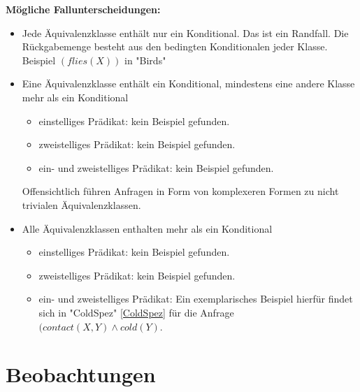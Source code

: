 \documentclass[a4paper, 11pt]{book}
\begin{document}
\textbf{Mögliche Fallunterscheidungen:}\label{Fallunterscheidung Formel MehrAequi}
	\begin{itemize}
		\item Jede Äquivalenzklasse enthält nur ein Konditional. Das ist ein Randfall. Die Rückgabemenge besteht aus den bedingten Konditionalen jeder Klasse. Beispiel $ (flies(X)) $ in "{}Birds"{}  
		\item Eine Äquivalenzklasse enthält ein Konditional, mindestens eine andere Klasse mehr als ein Konditional
		\begin{itemize}
			\item einstelliges Prädikat: kein Beispiel gefunden.
			\item zweistelliges Prädikat: kein Beispiel gefunden.
			\item ein- und zweistelliges Prädikat: kein Beispiel gefunden.
		\end{itemize}
		Offensichtlich führen Anfragen in Form von komplexeren Formen zu nicht trivialen Äquivalenzklassen. 
		\item Alle Äquivalenzklassen enthalten mehr als ein Konditional
			\begin{itemize}
			\item einstelliges Prädikat: kein Beispiel gefunden.
				\item zweistelliges Prädikat: kein Beispiel gefunden.
			\item ein- und zweistelliges Prädikat: Ein exemplarisches Beispiel hierfür findet sich in "{}ColdSpez"{} \ref{ColdSpez} für die Anfrage  $ (contact(X,Y) \land cold(Y) $.
		\end{itemize}
	\end{itemize}

\section{Beobachtungen}
\end{document}
